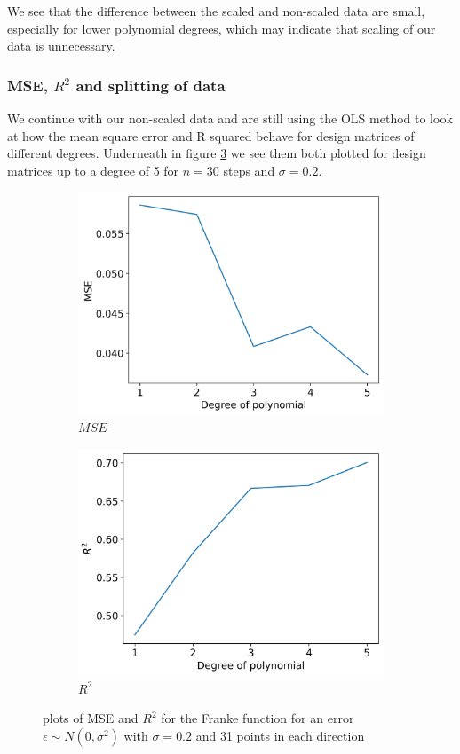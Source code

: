 \documentclass[12pt]{article}
\begin{document}
We see that the difference between the scaled and non-scaled data are small, especially for lower polynomial degrees, which may indicate that scaling of our data is unnecessary.

\subsubsection{MSE, $R^2$ and splitting of data}
We continue with our non-scaled data and are still using the OLS method to look at how the mean square error and R squared behave for design matrices of different degrees. Underneath in figure \ref{fig:r2_mse_5} we see them both plotted for design matrices up to a degree of 5 for $n=30$ steps and $\sigma=0.2$.
\begin{figure}[H]
  \begin{subfigure}{.5\textwidth}
    \centering
    \includegraphics[width=\textwidth]{../figures/mse_ols_5.png}
    \caption{$MSE$}
    \label{fig:}
  \end{subfigure}
  \begin{subfigure}{.5\textwidth}
    \centering
    \includegraphics[width=\textwidth]{../figures/r2_ols_5.png}
    \caption{$R^2$}
    \label{fig:}
  \end{subfigure}
  \caption{plots of MSE and $R^2$ for the Franke function for an error $\epsilon \sim N(0, \sigma^2)$ with $\sigma=0.2$ and 31 points in each direction}
  \label{fig:r2_mse_5}
\end{figure}
\end{document}
